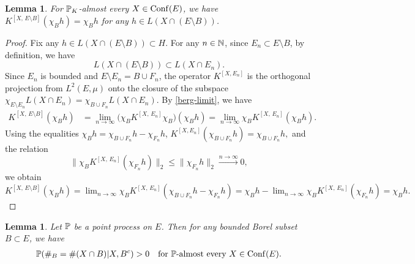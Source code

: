 \documentclass[12pt]{paper}
\newtheorem{lemma}[theorem]{Lemma}
\numberwithin{theorem}{section}
\numberwithin{figure}{section}
\numberwithin{equation}{section}
\begin{document}
\begin{lemma}\label{lem-id}
For $\mathbb{P}_K$-almost every $X\in \mathrm{Conf}(E)$, we have $K^{[X, \, E \setminus B]} (\chi_B h) = \chi_B h$ for any $h\in L(X \cap  (E \setminus B))$.
\end{lemma}



\begin{proof}
Fix any $h \in L(X \cap (E \setminus B)) \subset H$. For any $n\in \mathbb{N}$, since $E_n \subset E \setminus B$,  by definition, we have
$$
L(X \cap (E \setminus B)) \subset  L(X \cap E_n).
$$
Since $E_n$ is bounded and $E\setminus E_n = B \cup F_n$, the operator $K^{[X, E_n]}$ is the orthogonal projection from $L^2(E,\mu)$ onto the closure of the subspace
$
\chi_{E \setminus E_n} L(X \cap E_n)  =  \chi_{B \cup F_n} L (X \cap E_n).
$
By \eqref{berg-limit}, we have
\begin{align*}
K^{[X, \, E \setminus B]} (\chi_B h) & =\lim_{n\to\infty} \big(\chi_{B} K^{[X, \, E_n]} \chi_{B}\big)(\chi_B h)  = \lim_{n\to\infty} \chi_{B} K^{[X, \, E_n]}(\chi_B h).
\end{align*}
Using the equalities  $\chi_B h = \chi_{B \cup F_n} h  - \chi_{F_n} h$,
$
K^{[X, E_n]} (\chi_{B\cup F_n} h ) = \chi_{B\cup F_n} h,
$
and the relation $$
\| \chi_{B} K^{[X, \, E_n]}(\chi_{F_n} h) \|_2 \le \| \chi_{F_n} h \|_2 \xrightarrow{n\to\infty} 0,
$$
we obtain
$
K^{[X, \, E \setminus B]} (\chi_B h)  =\lim_{n\to\infty} \chi_{B} K^{[X, \, E_n]}(\chi_{B\cup F_n} h - \chi_{F_n} h) = \chi_B h - \lim_{n\to\infty}  \chi_{B} K^{[X, \, E_n]}(\chi_{F_n} h)= \chi_B h.
$
\end{proof}




\begin{lemma}\label{lem-good-rel}
Let $\mathbb{P}$ be a point process on $E$.  Then for any bounded Borel subset $B\subset E$, we have
\begin{align}\label{non-vanish-con}
\mathbb{P}(\#_B = \#(X \cap B) | X, B^c) > 0 \quad \text{for $\mathbb{P}$-almost every $X \in \mathrm{Conf}(E)$}.
\end{align}
\end{lemma}
\end{document}
